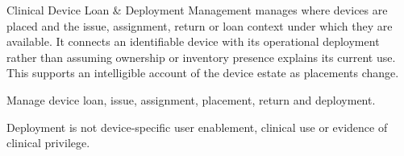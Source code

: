 Clinical Device Loan \& Deployment Management manages where devices are placed and the issue, assignment, return or loan context under which they are available. It connects an identifiable device with its operational deployment rather than assuming ownership or inventory presence explains its current use. This supports an intelligible account of the device estate as placements change.



Manage device loan, issue, assignment, placement, return and deployment.



Deployment is not device-specific user enablement, clinical use or evidence of clinical privilege.


